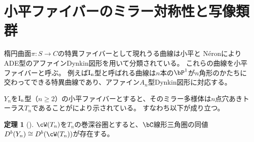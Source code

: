 \documentclass[uplatex,11pt,a4paper,dvipdfmx]{jsarticle}
\numberwithin{equation}{section}
\theoremstyle{definition}
\newtheorem{theorem}{定理}[section]
\begin{document}
\section{小平ファイバーのミラー対称性と写像類群}
楕円曲面$\pi \colon S \to C$の特異ファイバーとして現れうる曲線は小平と N\'{e}ronによりADE型のアファインDynkin図形を用いて分類されている。
これらの曲線を小平ファイバーと呼ぶ。
例えば$\rm{I}_n$型と呼ばれる曲線は$n$本の$\bP^1$が$n$角形のかたちに交わってできる特異曲線であり、アファイン$A_n$型Dynkin図形に対応する。



$Y_n$を$\rm{I}_n$型（$n \geq 2$）の小平ファイバーとすると、そのミラー多様体は$n$点穴あきトーラス$T_n$であることが\cite{MR3663596}により示されている。
すなわち以下が成り立つ。
\begin{theorem}[\cite{MR3663596}]
    $\cW(T_n)$を$T_n$の巻深谷圏とすると、$\bC$線形三角圏の同値$D^b(Y_n) \cong D^b(\cW(T_n))$が存在する。
\end{theorem}
\end{document}

